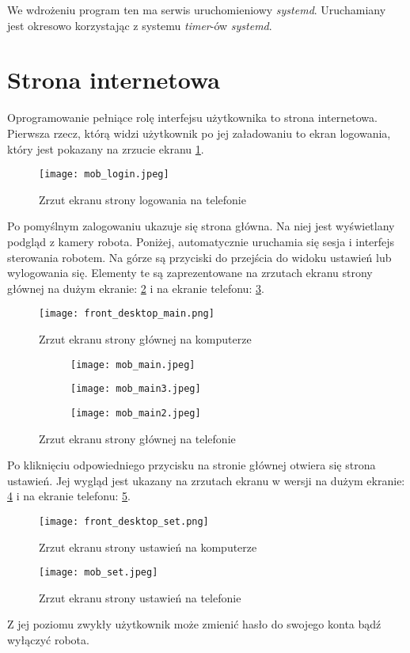 We wdrożeniu program ten ma serwis uruchomieniowy \textit{systemd}.
Uruchamiany jest okresowo korzystając z systemu \textit{timer}-ów \textit{systemd}.

\section{Strona internetowa}
Oprogramowanie pełniące rolę interfejsu użytkownika to strona internetowa.
Pierwsza rzecz, którą widzi użytkownik po jej załadowaniu to ekran logowania, który jest pokazany na zrzucie ekranu \ref{rys:mob_login}.
\begin{figure}[!hb]
    \centering \texttt{[image: mob\_login.jpeg]}
    \caption{Zrzut ekranu strony logowania na telefonie}
    \label{rys:mob_login}
\end{figure}
Po pomyślnym zalogowaniu ukazuje się strona główna.
Na niej jest wyświetlany podgląd z kamery robota.
Poniżej, automatycznie uruchamia się sesja i interfejs sterowania robotem.
Na górze są przyciski do przejścia do widoku ustawień lub wylogowania się.
Elementy te są zaprezentowane na zrzutach ekranu strony głównej na dużym ekranie: \ref{rys:front_desktop_main} i na ekranie telefonu: \ref{rys:mob_main}.
\begin{figure}[H]
    \centering \texttt{[image: front\_desktop\_main.png]}
    \caption{Zrzut ekranu strony głównej na komputerze}
    \label{rys:front_desktop_main}
\end{figure}
\begin{figure}[H]
    \begin{subfigure}{.3\textwidth}
        \centering \texttt{[image: mob\_main.jpeg]}
    \end{subfigure}
    \begin{subfigure}{.3\textwidth}
        \centering \texttt{[image: mob\_main3.jpeg]}
    \end{subfigure}
    \begin{subfigure}{.3\textwidth}
      \centering \texttt{[image: mob\_main2.jpeg]}
    \end{subfigure}
    \caption{Zrzut ekranu strony głównej na telefonie}
    \label{rys:mob_main}
\end{figure}

Po kliknięciu odpowiedniego przycisku na stronie głównej otwiera się strona ustawień.
Jej wygląd jest ukazany na zrzutach ekranu w wersji na dużym ekranie: \ref{rys:front_desktop_set} i na ekranie telefonu: \ref{rys:mob_set}.
\begin{figure}[H]
    \centering \texttt{[image: front\_desktop\_set.png]}
    \caption{Zrzut ekranu strony ustawień na komputerze}
    \label{rys:front_desktop_set}
\end{figure}
\begin{figure}[H]
    \centering \texttt{[image: mob\_set.jpeg]}
    \caption{Zrzut ekranu strony ustawień na telefonie}
    \label{rys:mob_set}
\end{figure}
Z jej poziomu zwykły użytkownik może zmienić hasło do swojego konta bądź wyłączyć robota.

